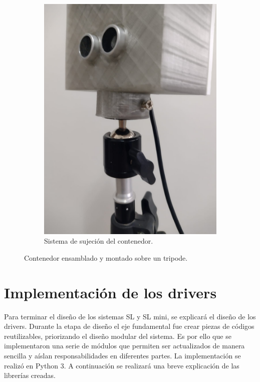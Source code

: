 \begin{figure}[bth]
\begin{subfigure}{.45\textwidth}
        \includegraphics[width=\textwidth]{imgs/sistema-sujecion.jpeg}
        \caption{Sistema de sujeción del contenedor.}
    \end{subfigure}
    \caption{Contenedor ensamblado y montado sobre un tripode.}
    \label{fig:contenedor-impreso}
\end{figure}

\section{Implementación de los drivers}

Para terminar el diseño de los sistemas SL y SL mini, se explicará el diseño de los drivers. Durante la etapa de diseño el eje fundamental fue crear piezas de códigos reutilizables, priorizando el diseño modular del sistema.
Es por ello que se implementaron una serie de módulos que permiten ser actualizados de manera sencilla y aíslan responsabilidades en diferentes partes. La implementación se realizó en Python 3. A continuación se realizará una breve explicación de las librerías creadas.


